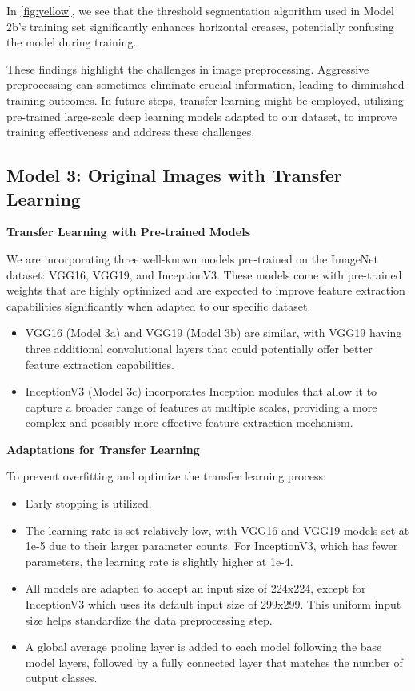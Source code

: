 In \autoref{fig:yellow}, we see that the threshold segmentation algorithm used in Model 2b’s training set significantly enhances horizontal creases, potentially confusing the model during training.

These findings highlight the challenges in image preprocessing. Aggressive preprocessing can sometimes eliminate crucial information, leading to diminished training outcomes. In future steps, transfer learning might be employed, utilizing pre-trained large-scale deep learning models adapted to our dataset, to improve training effectiveness and address these challenges.


\subsection{Model 3: Original Images with Transfer Learning}

\textbf{Transfer Learning with Pre-trained Models}

We are incorporating three well-known models pre-trained on the ImageNet dataset: VGG16, VGG19, and InceptionV3. These models come with pre-trained weights that are highly optimized and are expected to improve feature extraction capabilities significantly when adapted to our specific dataset.

\begin{itemize}
    \item VGG16 (Model 3a) and VGG19 (Model 3b) are similar, with VGG19 having three additional convolutional layers that could potentially offer better feature extraction capabilities.
    \item InceptionV3 (Model 3c) incorporates Inception modules that allow it to capture a broader range of features at multiple scales, providing a more complex and possibly more effective feature extraction mechanism.
\end{itemize}

\textbf{Adaptations for Transfer Learning}

To prevent overfitting and optimize the transfer learning process:

\begin{itemize}
    \item Early stopping is utilized.
    \item The learning rate is set relatively low, with VGG16 and VGG19 models set at 1e-5 due to their larger parameter counts. For InceptionV3, which has fewer parameters, the learning rate is slightly higher at 1e-4.
    \item All models are adapted to accept an input size of 224x224, except for InceptionV3 which uses its default input size of 299x299. This uniform input size helps standardize the data preprocessing step.
    \item A global average pooling layer is added to each model following the base model layers, followed by a fully connected layer that matches the number of output classes.
\end{itemize}


